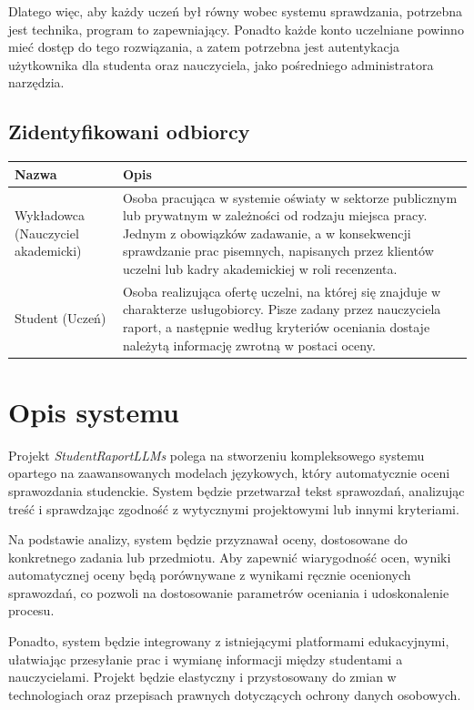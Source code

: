 \documentclass[a4paper, 12pt]{article}
\begin{document}
Dlatego więc, aby każdy uczeń był równy wobec systemu sprawdzania, potrzebna jest technika, program to zapewniający.
Ponadto każde konto uczelniane powinno mieć dostęp do tego rozwiązania, a zatem potrzebna jest autentykacja użytkownika dla studenta oraz nauczyciela, jako pośredniego administratora narzędzia.

\subsection{Zidentyfikowani odbiorcy}

\begin{center}
\footnotesize
\begin{tabular}{|p{}|p{}|}
\hline
\textbf{Nazwa} & \textbf{Opis} \\
\hline
Wykładowca (Nauczyciel akademicki) & Osoba pracująca w systemie oświaty w sektorze publicznym lub prywatnym w zależności od rodzaju miejsca pracy. Jednym z obowiązków zadawanie, a w konsekwencji sprawdzanie prac pisemnych, napisanych przez klientów uczelni lub kadry akademickiej w roli recenzenta. \\
\hline
Student (Uczeń) & Osoba realizująca ofertę uczelni, na której się znajduje w charakterze usługobiorcy. Pisze zadany przez nauczyciela raport, a następnie według kryteriów oceniania dostaje należytą informację zwrotną w postaci oceny. \\
\hline
\end{tabular}
\end{center}

\newpage
\section{Opis systemu}
Projekt \textit{StudentRaportLLMs} polega na stworzeniu kompleksowego systemu opartego na zaawansowanych modelach językowych, który automatycznie oceni sprawozdania studenckie.
System będzie przetwarzał tekst sprawozdań, analizując treść i sprawdzając zgodność z wytycznymi projektowymi lub innymi kryteriami.

Na podstawie analizy, system będzie przyznawał oceny, dostosowane do konkretnego zadania lub przedmiotu.
Aby zapewnić wiarygodność ocen, wyniki automatycznej oceny będą porównywane z wynikami ręcznie ocenionych sprawozdań, co pozwoli na dostosowanie parametrów oceniania i udoskonalenie procesu.

Ponadto, system będzie integrowany z istniejącymi platformami edukacyjnymi, ułatwiając przesyłanie prac i wymianę informacji między studentami a nauczycielami.
Projekt będzie elastyczny i przystosowany do zmian w technologiach oraz przepisach prawnych dotyczących ochrony danych osobowych.
\end{document}
